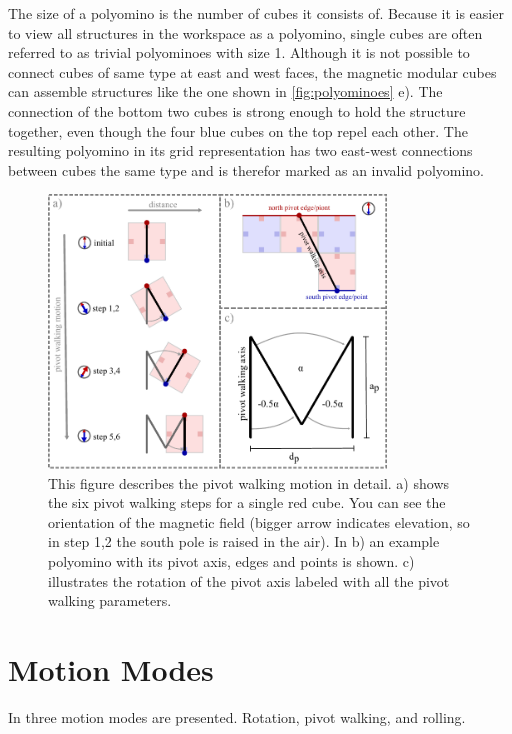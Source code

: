 The size of a polyomino is the number of cubes it consists of.
Because it is easier to view all structures in the workspace as a polyomino, single cubes are often referred to as trivial polyominoes with size 1.
Although it is not possible to connect cubes of same type at east and west faces, the magnetic modular cubes can assemble structures like the one shown in \autoref{fig:polyominoes} e).
The connection of the bottom two cubes is strong enough to hold the structure together, even though the four blue cubes on the top repel each other.
The resulting polyomino in its grid representation has two east-west connections between cubes the same type and is therefor marked as an invalid polyomino.

\begin{figure}
	\centering
	\includegraphics[width=0.80\textwidth]{figures/pivot_walking.pdf}
	\caption[Illustration of the pivot walking motion]{This figure describes the pivot walking motion in detail. a) shows the six pivot walking steps for a single red cube. You can see the orientation of the magnetic field (bigger arrow indicates elevation, so in step 1,2 the south pole is raised in the air). In b) an example polyomino with its pivot axis, edges and points is shown. c) illustrates the rotation of the pivot axis labeled with all the pivot walking parameters.}
	\label{fig:pivot_walking}
\end{figure}

\section{Motion Modes}
\label{sec:motion}
In \cite{Bhattacharjee2022} three motion modes are presented. Rotation, pivot walking, and rolling.

